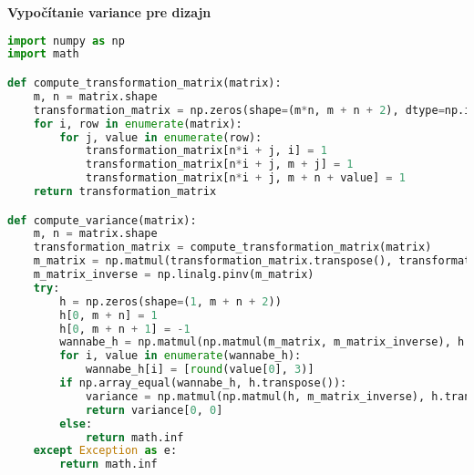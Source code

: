 \textbf{Vypočítanie variance pre dizajn}

\begin{lstlisting}[language=Python, basicstyle=\footnotesize]
import numpy as np
import math

def compute_transformation_matrix(matrix):
    m, n = matrix.shape
    transformation_matrix = np.zeros(shape=(m*n, m + n + 2), dtype=np.int8)
    for i, row in enumerate(matrix):
        for j, value in enumerate(row):
            transformation_matrix[n*i + j, i] = 1
            transformation_matrix[n*i + j, m + j] = 1
            transformation_matrix[n*i + j, m + n + value] = 1
    return transformation_matrix

def compute_variance(matrix):
    m, n = matrix.shape
    transformation_matrix = compute_transformation_matrix(matrix)
    m_matrix = np.matmul(transformation_matrix.transpose(), transformation_matrix)
    m_matrix_inverse = np.linalg.pinv(m_matrix)
    try:
        h = np.zeros(shape=(1, m + n + 2))
        h[0, m + n] = 1
        h[0, m + n + 1] = -1
        wannabe_h = np.matmul(np.matmul(m_matrix, m_matrix_inverse), h.transpose())
        for i, value in enumerate(wannabe_h):
            wannabe_h[i] = [round(value[0], 3)]
        if np.array_equal(wannabe_h, h.transpose()):
            variance = np.matmul(np.matmul(h, m_matrix_inverse), h.transpose())
            return variance[0, 0]
        else:
            return math.inf
    except Exception as e:
        return math.inf
\end{lstlisting}